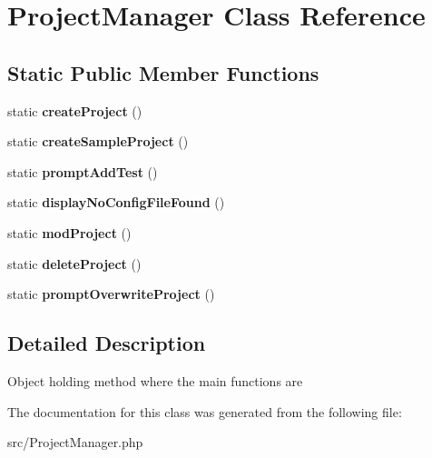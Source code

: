 \hypertarget{classProjectManager}{}\section{Project\+Manager Class Reference}
\label{classProjectManager}
\subsection*{Static Public Member Functions}
\begin{DoxyCompactItemize}
\item 
\mbox{\label{classProjectManager_afa4ee771ac7d6da3e4b76779745ebcfa}} 
static {\bfseries create\+Project} ()
\item 
\mbox{\label{classProjectManager_af594dfa22322495cf15c5c47078a3eef}} 
static {\bfseries create\+Sample\+Project} ()
\item 
\mbox{\label{classProjectManager_a05c781c75177c7f9165cde755220e7e1}} 
static {\bfseries prompt\+Add\+Test} ()
\item 
\mbox{\label{classProjectManager_a7eae0be214d994ccb4d8f732079f40bf}} 
static {\bfseries display\+No\+Config\+File\+Found} ()
\item 
\mbox{\label{classProjectManager_ae22d0ea1ed86b8ba48478e3d25553032}} 
static {\bfseries mod\+Project} ()
\item 
\mbox{\label{classProjectManager_af29d3ef5fceb1c2b6ac66596210b82d7}} 
static {\bfseries delete\+Project} ()
\item 
\mbox{\label{classProjectManager_a25b38d08f39666c093ef226557011d9e}} 
static {\bfseries prompt\+Overwrite\+Project} ()
\end{DoxyCompactItemize}


\subsection{Detailed Description}
Object holding method where the main functions are 

The documentation for this class was generated from the following file\+:\begin{DoxyCompactItemize}
\item 
src/Project\+Manager.\+php\end{DoxyCompactItemize}

